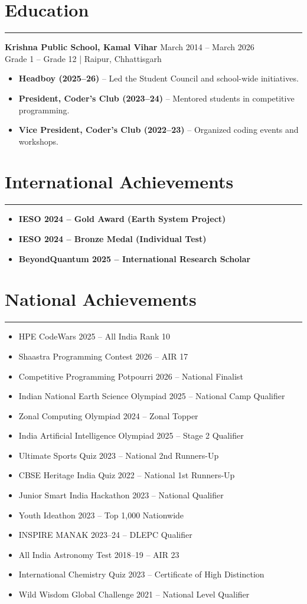 \documentclass[11pt,a4paper]{article}
\newcommand{\resumesection}[1]{
  \section*{#1}
  \vspace{-4pt}
  \hrule
  \vspace{5pt}
}
\begin{document}
\resumesection{Education}
\textbf{Krishna Public School, Kamal Vihar} \hfill March 2014 -- March 2026\\
Grade 1 – Grade 12 \;|\; Raipur, Chhattisgarh
\begin{itemize}
\item \textbf{Headboy (2025–26)} – Led the Student Council and school-wide initiatives.
\item \textbf{President, Coder’s Club (2023–24)} – Mentored students in competitive programming.
\item \textbf{Vice President, Coder’s Club (2022–23)} – Organized coding events and workshops.
\end{itemize}

\resumesection{International Achievements}
\begin{itemize}
\item \textbf{IESO 2024 – Gold Award (Earth System Project)}
\item \textbf{IESO 2024 – Bronze Medal (Individual Test)}
\item \textbf{BeyondQuantum 2025 – International Research Scholar}
\end{itemize}

\newpage

\resumesection{National Achievements}
\begin{itemize}
\item HPE CodeWars 2025 – All India Rank 10
\item Shaastra Programming Contest 2026 – AIR 17
\item Competitive Programming Potpourri 2026 – National Finalist
\item Indian National Earth Science Olympiad 2025 – National Camp Qualifier
\item Zonal Computing Olympiad 2024 – Zonal Topper
\item India Artificial Intelligence Olympiad 2025 – Stage 2 Qualifier
\item Ultimate Sports Quiz 2023 – National 2nd Runners-Up
\item CBSE Heritage India Quiz 2022 – National 1st Runners-Up
\item Junior Smart India Hackathon 2023 – National Qualifier
\item Youth Ideathon 2023 – Top 1,000 Nationwide
\item INSPIRE MANAK 2023–24 – DLEPC Qualifier
\item All India Astronomy Test 2018–19 – AIR 23
\item International Chemistry Quiz 2023 – Certificate of High Distinction
\item Wild Wisdom Global Challenge 2021 – National Level Qualifier
\end{itemize}
\end{document}

